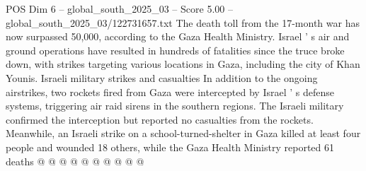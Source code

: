 \begin{textsample}{POS Dim 6 – global\_south\_2025\_03 – Score 5.00 – global\_south\_2025\_03/122731657.txt}
The death toll from the 17-month war has now surpassed 50,000, according to the Gaza Health Ministry.
Israel ' s air and ground operations have resulted in hundreds of fatalities since the truce broke down, with strikes targeting various locations in Gaza, including the city of Khan Younis.
Israeli military strikes and casualties In addition to the ongoing airstrikes, two rockets fired from Gaza were intercepted by Israel ' s defense systems, triggering air raid sirens in the southern regions.
The Israeli military confirmed the interception but reported no casualties from the rockets.
Meanwhile, an Israeli strike on a school-turned-shelter in Gaza killed at least four people and wounded 18 others, while the Gaza Health Ministry reported 61 deaths @ @ @ @ @ @ @ @ @ @

\end{textsample}
